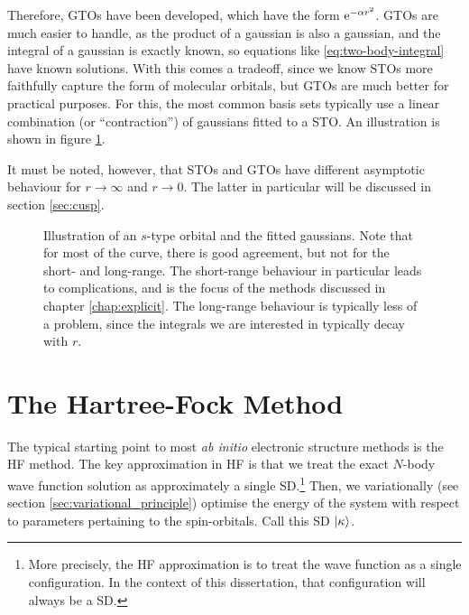 Therefore, \glspl{GTO} have been developed, which have the form $\mathrm{e}^{-\alpha r^2}$. \glspl{GTO} are much easier to handle, as the product of a gaussian is also a gaussian, and the integral of a gaussian is exactly known, so equations like \eqref{eq:two-body-integral} have known solutions. With this comes a tradeoff, since we know \glspl{STO} more faithfully capture the form of molecular orbitals, but \glspl{GTO} are much better for practical purposes. For this, the most common basis sets typically use a linear combination (or ``contraction'') of gaussians fitted to a \gls{STO}. An illustration is shown in figure \ref{fig:sto-gto}.

It must be noted, however, that \glspl{STO} and \glspl{GTO} have different asymptotic behaviour for $r\to\infty$ and $r\to 0$. The latter in particular will be discussed in section \ref{sec:cusp}.

\begin{figure}[htbp]
    \centering

    \caption{Illustration of an $s$-type orbital and the fitted gaussians. Note that for most of the curve, there is good agreement, but not for the short- and long-range. The short-range behaviour in particular leads to complications, and is the focus of the methods discussed in chapter \ref{chap:explicit}. The long-range behaviour is typically less of a problem, since the integrals we are interested in typically decay with $r$. }
    \label{fig:sto-gto}
\end{figure}

\section{The Hartree-Fock Method}
\label{sec:hf}

The typical starting point to most \emph{ab initio} electronic structure methods is the \gls{HF} method. The key approximation in \gls{HF} is that we treat the exact $N$-body wave function solution as approximately a single \gls{SD}.\footnote{More precisely, the \gls{HF} approximation is to treat the wave function as a single configuration. In the context of this dissertation, that configuration will always be a \gls{SD}.} Then, we variationally (see section \ref{sec:variational_principle}) optimise the energy of the system with respect to parameters pertaining to the spin-orbitals. Call this \gls{SD} $\ket{\kappa}$.

